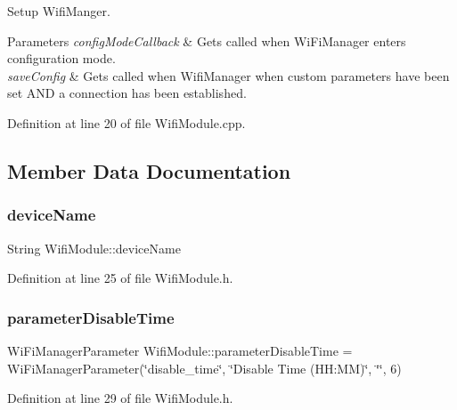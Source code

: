 Setup Wifi\+Manger. 


\begin{DoxyParams}{Parameters}
{\em config\+Mode\+Callback} & Gets called when Wi\+Fi\+Manager enters configuration mode. \\
\hline
{\em save\+Config} & Gets called when Wifi\+Manager when custom parameters have been set A\+ND a connection has been established. \\
\hline
\end{DoxyParams}


Definition at line 20 of file Wifi\+Module.\+cpp.



\subsection{Member Data Documentation}
\mbox{\label{class_wifi_module_a5887fc96e71a65413c0e8645c8947e17}} 
\subsubsection{\texorpdfstring{deviceName}{deviceName}}
{\footnotesize\ttfamily String Wifi\+Module\+::device\+Name\hspace{0.3cm}{\ttfamily [private]}}



Definition at line 25 of file Wifi\+Module.\+h.

\mbox{\label{class_wifi_module_a8b457a11d91c9f4a5f88a4087580f8b8}} 
\subsubsection{\texorpdfstring{parameterDisableTime}{parameterDisableTime}}
{\footnotesize\ttfamily Wi\+Fi\+Manager\+Parameter Wifi\+Module\+::parameter\+Disable\+Time = Wi\+Fi\+Manager\+Parameter(\char`\"{}disable\+\_\+time\char`\"{}, \char`\"{}Disable Time (H\+H\+:\+MM)\char`\"{}, \char`\"{}\char`\"{}, 6)\hspace{0.3cm}{\ttfamily [private]}}



Definition at line 29 of file Wifi\+Module.\+h.

